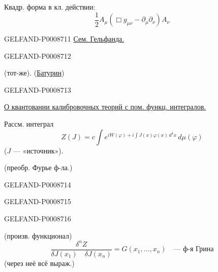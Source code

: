 Квадр. форма в кл. действии:
\begin{equation*}
\frac12 A_\mu(\Box g_{\mu\nu}-\partial_\mu\partial_\nu)A_\nu
\tag{28}
\end{equation*}


\begin{GelfandAdjacentEvidence}{GELFAND-P000871}{1}
\qquad\uline{Сем. Гельфанда.}
\end{GelfandAdjacentEvidence}
\begin{GelfandAdjacentEvidence}{GELFAND-P000871}{2}


 (тот-же). (\uline{Батурин})
\end{GelfandAdjacentEvidence}
\begin{GelfandAdjacentEvidence}{GELFAND-P000871}{3}


\uline{О квантовании калибровочных теорий с пом. функц. интегралов.}

Рассм. интеграл
\begin{equation*}
Z(J)=c\int e^{iW(\varphi)+i\int J(x)\varphi(x)\,d^4x}\,d\mu(\varphi)
\tag{1}
\end{equation*}
($J$ --- «источник»).

(преобр. Фурье ф-ла.)
\end{GelfandAdjacentEvidence}
\begin{GelfandAdjacentEvidence}{GELFAND-P000871}{4}

\end{GelfandAdjacentEvidence}
\begin{GelfandAdjacentEvidence}{GELFAND-P000871}{5}

\end{GelfandAdjacentEvidence}
\begin{GelfandAdjacentEvidence}{GELFAND-P000871}{6}


(произв. функционал)
\begin{equation*}
\frac{\delta^n Z}{\delta J(x_1)\quad\delta J(x_n)}
=G(x_1,\ldots,x_n)\quad\text{--- ф-я Грина}
\tag{2}
\end{equation*}
(через неё всё выраж.)
\end{GelfandAdjacentEvidence}
